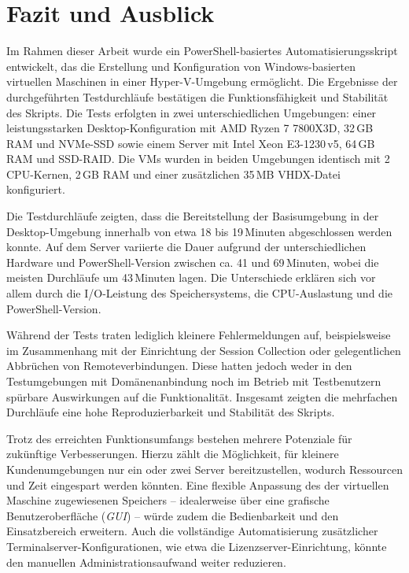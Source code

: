 \documentclass[conference]{IEEEtran}
\begin{document}
\chapter{Fazit und Ausblick}

Im Rahmen dieser Arbeit wurde ein PowerShell-basiertes Automatisierungsskript entwickelt, das die Erstellung und Konfiguration von Windows-basierten virtuellen Maschinen in einer Hyper-V-Umgebung ermöglicht.
Die Ergebnisse der durchgeführten Testdurchläufe bestätigen die Funktionsfähigkeit und Stabilität des Skripts. Die Tests erfolgten in zwei unterschiedlichen Umgebungen: einer leistungsstarken Desktop-Konfiguration mit AMD Ryzen 7 7800X3D, 32 GB RAM und NVMe-SSD sowie einem Server mit Intel Xeon E3-1230 v5, 64 GB RAM und SSD-RAID. Die VMs wurden in beiden Umgebungen identisch mit 2 CPU-Kernen, 2 GB RAM und einer zusätzlichen 35 MB VHDX-Datei konfiguriert.

Die Testdurchläufe zeigten, dass die Bereitstellung der Basisumgebung in der Desktop-Umgebung innerhalb von etwa 18 bis 19 Minuten abgeschlossen werden konnte. Auf dem Server variierte die Dauer aufgrund der unterschiedlichen Hardware und PowerShell-Version zwischen ca. 41 und 69 Minuten, wobei die meisten Durchläufe um 43 Minuten lagen. Die Unterschiede erklären sich vor allem durch die I/O-Leistung des Speichersystems, die CPU-Auslastung und die PowerShell-Version.

Während der Tests traten lediglich kleinere Fehlermeldungen auf, beispielsweise im Zusammenhang mit der Einrichtung der Session Collection oder gelegentlichen Abbrüchen von Remoteverbindungen. Diese hatten jedoch weder in den Testumgebungen mit Domänenanbindung noch im Betrieb mit Testbenutzern spürbare Auswirkungen auf die Funktionalität. Insgesamt zeigten die mehrfachen Durchläufe eine hohe Reproduzierbarkeit und Stabilität des Skripts.

Trotz des erreichten Funktionsumfangs bestehen mehrere Potenziale für zukünftige Verbesserungen. Hierzu zählt die Möglichkeit, für kleinere Kundenumgebungen nur ein oder zwei Server bereitzustellen, wodurch Ressourcen und Zeit eingespart werden könnten. Eine flexible Anpassung des der virtuellen Maschine zugewiesenen Speichers – idealerweise über eine grafische Benutzeroberfläche (\textit{GUI}) – würde zudem die Bedienbarkeit und den Einsatzbereich erweitern. Auch die vollständige Automatisierung zusätzlicher Terminalserver-Konfigurationen, wie etwa die Lizenzserver-Einrichtung, könnte den manuellen Administrationsaufwand weiter reduzieren.
\end{document}
